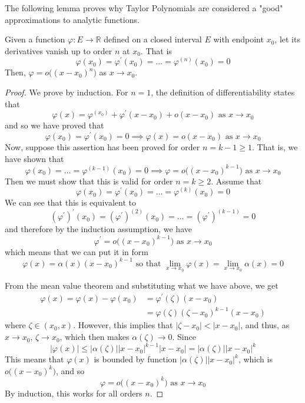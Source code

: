   The following lemma proves why Taylor Polynomials are considered a "good" approximations to analytic functions. 

  \begin{lemma}
    Given a function $\varphi: E \longrightarrow \mathbb{R}$ defined on a closed interval $E$ with endpoint $x_0$, let its derivatives vanish up to order $n$ at $x_0$. That is
    \[\varphi(x_0) = \varphi^\prime (x_0) = \ldots = \varphi^{(n)} (x_0) = 0\]
    Then, $\varphi = o\big((x - x_0)^n\big)$ as $x \rightarrow x_0$. 
  \end{lemma}
  \begin{proof}
  We prove by induction. For $n = 1$, the definition of differentiability states that 
  \[\varphi(x) = \varphi^(x_0) + \varphi^\prime (x - x_0) + o(x - x_0) \text{ as } x \rightarrow x_0\]
  and so we have proved that 
  \[\varphi(x_0) = \varphi^\prime (x_0) = 0 \implies \varphi(x) = o(x - x_0) \text{ as } x \rightarrow x_0\]
  Now, suppose this assertion has been proved for order $n = k - 1 \geq 1$. That is, we have shown that 
  \[\varphi(x_0) = \ldots = \varphi^{(k-1)}(x_0) = 0 \implies \varphi= o\big((x - x_0)^{k-1}\big) \text{ as } x \rightarrow x_0\]
  Then we must show that this is valid for order $n = k \geq 2$. Assume that 
  \[\varphi(x_0) = \varphi^\prime (x_0) = \ldots = \varphi^{(k)} (x_0) = 0\]
  We can see that this is equivalent to
  \[(\varphi^\prime)^\prime (x_0) = (\varphi^\prime)^{(2)} (x_0) = \ldots = (\varphi^\prime)^{(k-1)} = 0\]
  and therefore by the induction assumption, we have
  \[\varphi^\prime = o\big( (x - x_0)^{k-1}\big) \text{ as } x \rightarrow x_0\]
  which means that we can put it in form 
  \[\varphi(x) = \alpha (x) (x - x_0)^{k-1} \text{ so that } \lim_{x \rightarrow x_0} \varphi(x) = \lim_{x \rightarrow x_0} \alpha(x) = 0 \]

  From the mean value theorem and substituting what we have above, we get 
  \begin{align*}
      \varphi(x) = \varphi(x) - \varphi(x_0) & = \varphi^\prime(\zeta) (x - x_0) \\
      & = \varphi (\zeta) (\zeta - x_0)^{k-1} (x - x_0)
  \end{align*}
  where $\zeta \in (x_0, x)$. However, this implies that $|\zeta - x_0| < |x - x_0|$, and thus, as $x \rightarrow x_0$, $\zeta \rightarrow x_0$, which then makes $\alpha(\zeta) \rightarrow 0$. Since
  \[|\varphi (x)| \leq |\alpha(\zeta)| |x - x_0|^{k-1} |x - x_0| = |\alpha(\zeta)| |x - x_0|^k\]
  This means that $\varphi(x)$ is bounded by function $|\alpha(\zeta)| |x - x_0|^k$, which is $o\big((x-x_0)^k\big)$, and so 
  \[\varphi = o\big( (x - x_0)^k \big) \text{ as } x \rightarrow x_0\]
  By induction, this works for all orders $n$. 
  \end{proof}

